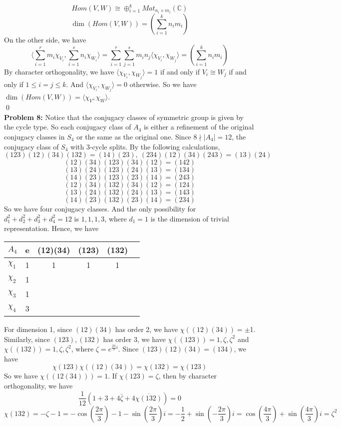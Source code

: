 \documentclass[12pt]{amsart}
\newcommand{\C}{\mathbb{C}}
\begin{document}
\[Hom(V,W)\cong \oplus_{i=1}^k Mat_{n_i\times m_i}(\C)\]
\[\dim(Hom(V,W))=(\sum_{i=1}^kn_im_i)\]
On the other side, we have 
\[\langle\sum_{i=1}^rm_i\chi_{V_i},\sum_{i=1}^sn_i\chi_{W_i}\rangle=\sum_{i=1}^r\sum_{j=1}^sm_in_j\langle\chi_{V_i},\chi_{W_j}\rangle=(\sum_{i=1}^kn_im_i)\]
By character orthogonality, we have $\langle\chi_{V_i},\chi_{W_j}\rangle=1$ if and only if $V_i\cong W_j$ if and only if $1\leq i=j\leq k$. And $\langle\chi_{V_i},\chi_{W_j}\rangle=0$ otherwise.
So we have $\dim (Hom(V,W))=\langle\chi_V,\chi_W\rangle$.
\\\qed\\
\textbf{Problem 8:} Notice that the conjugacy classes of symmetric group is given by the cycle type. So each conjugacy class of $A_4$ is either a refinement of the original conjugacy classes in $S_4$ or the same as the original one. Since $8\nmid |A_4|=12$, the conjugacy class of $S_4$ with 3-cycle splits. By the following calculations,
\[(123)(12)(34)(132)=(14)(23),\  (234)(12)(34)(243)=(13)(24)\]
\[(12)(34)(123)(34)(12)=(142)\]
\[(13)(24)(123)(24)(13)=(134)\]
\[(14)(23)(123)(23)(14)=(243)\]
\[(12)(34)(132)(34)(12)=(124)\]
\[(13)(24)(132)(24)(13)=(143)\]
\[(14)(23)(132)(23)(14)=(234)\]
So we have four conjugacy classes. And the only possibility for $d_1^2+d_2^2+d_3^2+d_4^2=12$ is $1,1,1,3$, where $d_1=1$ is the dimension of trivial representation. 
Hence, we have 
\begin{table}[H]
    \centering
    \begin{tabular}{l|ccccl}
        $A_4$    & e & (12)(34) & (123) & (132)  \\ \hline
        $\chi_1$ & 1 & 1  & 1       & 1            \\
        $\chi_2$ & 1 &            \\
        $\chi_3$ & 1 &             \\
        $\chi_4$ & 3 &             
    \end{tabular}
\end{table}
For dimension 1, since $(12)(34)$ has order 2, we have $\chi((12)(34))=\pm $1. Similarly, since $(123),(132)$ has order 3, we have $\chi((123))=1,\zeta,\zeta^2$ and $\chi((132))=1,\zeta,\zeta^2$, where $\zeta=e^{\frac{2\pi }{3}i}$.
Since $(123)(12)(34)=(134)$, we have 
\[\chi(123)\chi((12)(34))=\chi(132)=\chi(123)\]
So we have $\chi((12(34)))=1$. If $\chi(123)=\zeta$, then by character orthogonality, we have 
\[\frac{1}{12}(1+3+4\bar{\zeta}+4\overline{\chi(132)})=0\]
\[\chi(132)=-\zeta-1=-\cos(\frac{2\pi}{3})-1-\sin(\frac{2\pi}{3})i=-\frac{1}{2}+\sin(-\frac{2\pi}{3})i=\cos(\frac{4\pi}{3})+\sin(\frac{4\pi}{3})i=\zeta^2\]
\end{document}

